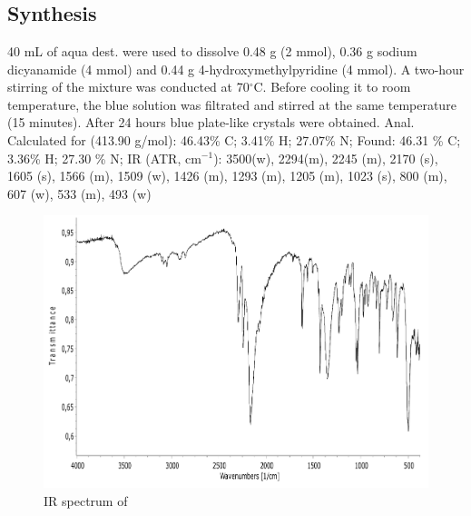 \section{}
\subsection{Synthesis}
40 mL of aqua dest. were used to dissolve 0.48 g  (2 mmol), 0.36 g sodium dicyanamide (4 mmol) and 0.44 g 4-hydroxymethylpyridine (4 mmol). A two-hour stirring of the mixture was conducted at 70$^\circ$C. Before cooling it to room temperature, the blue solution was filtrated and stirred at the same temperature (15 minutes). After 24 hours blue plate-like crystals were obtained.
Anal. Calculated for  (413.90 g/mol): 46.43\% C; 3.41\% H; 27.07\% N;
Found: 46.31 \% C; 3.36\% H; 27.30 \% N;
IR (ATR, cm$^{-1}$): 3500(w), 2294(m), 2245 (m), 2170 (s), 1605 (s), 1566 (m), 1509 (w), 1426 (m), 1293 (m), 1205 (m), 1023 (s), 800 (m), 607 (w), 533 (m), 493 (w)

\begin{figure}[h!]
\centering
\includegraphics[width=1\textwidth]{figures/CuD4HOMP-IR.pdf}
\caption{IR spectrum of }
\end{figure}



